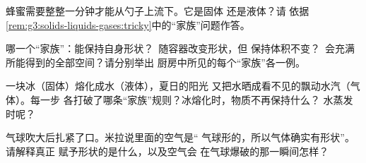 \begin{exercise}[$\star$]\label{exo:g3:solids-liquids-gases:8}
蜂蜜需要整整一分钟才能从勺子上流下。它是固体
还是液体？请
依据\cref{rem:g3:solids-liquids-gases:tricky}中的“家族”问题作答。
\end{exercise}

\begin{exercise}[$\star$]\label{exo:g3:solids-liquids-gases:9}
哪一个“家族”：能保持自身形状？\ 随容器改变形状，但
保持体积不变？\ 会充满所能得到的全部空间？请分别举出
厨房中所见的每个“家族”各一例。
\end{exercise}

\begin{exercise}[$\star\star$]\label{exo:g3:solids-liquids-gases:10}
一块冰（固体）熔化成水（液体），夏日的阳光
又把水晒成看不见的飘动水汽（气体）。每一步
各打破了哪条“家族”规则？冰熔化时，物质不再保持什么？
水蒸发时呢？
\end{exercise}

\begin{exercise}[$\star\star$]\label{exo:g3:solids-liquids-gases:11}
气球吹大后扎紧了口。米拉说里面的空气是“
气球形的，所以气体确实有形状”。请解释真正
赋予形状的是什么，以及空气会
在气球爆破的那一瞬间怎样？
\end{exercise}
